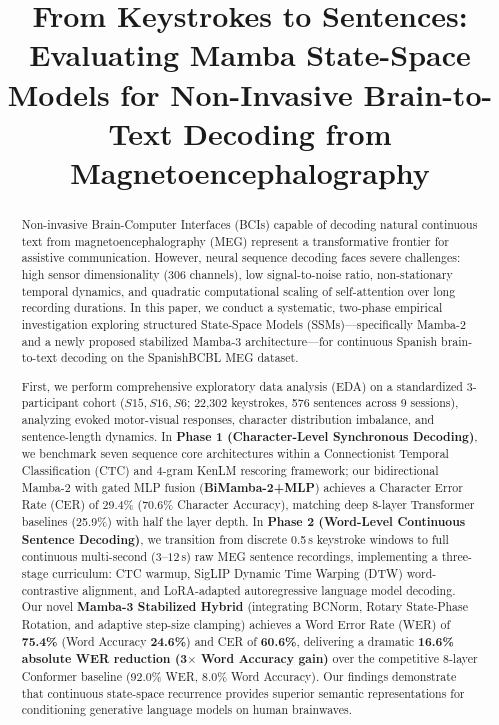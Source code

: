 \documentclass[conference]{IEEEtran}
\begin{document}
\title{From Keystrokes to Sentences: Evaluating Mamba State-Space Models for Non-Invasive Brain-to-Text Decoding from Magnetoencephalography}

\author{
}

\maketitle

\begin{abstract}
Non-invasive Brain-Computer Interfaces (BCIs) capable of decoding natural continuous text from magnetoencephalography (MEG) represent a transformative frontier for assistive communication. However, neural sequence decoding faces severe challenges: high sensor dimensionality (306 channels), low signal-to-noise ratio, non-stationary temporal dynamics, and quadratic computational scaling of self-attention over long recording durations. In this paper, we conduct a systematic, two-phase empirical investigation exploring structured State-Space Models (SSMs)---specifically Mamba-2 and a newly proposed stabilized Mamba-3 architecture---for continuous Spanish brain-to-text decoding on the SpanishBCBL MEG dataset. 

First, we perform comprehensive exploratory data analysis (EDA) on a standardized 3-participant cohort ($S15, S16, S6$; 22,302 keystrokes, 576 sentences across 9 sessions), analyzing evoked motor-visual responses, character distribution imbalance, and sentence-length dynamics. In \textbf{Phase 1 (Character-Level Synchronous Decoding)}, we benchmark seven sequence core architectures within a Connectionist Temporal Classification (CTC) and 4-gram KenLM rescoring framework; our bidirectional Mamba-2 with gated MLP fusion (\textbf{BiMamba-2+MLP}) achieves a Character Error Rate (CER) of 29.4\% (70.6\% Character Accuracy), matching deep 8-layer Transformer baselines (25.9\%) with half the layer depth. In \textbf{Phase 2 (Word-Level Continuous Sentence Decoding)}, we transition from discrete 0.5\,s keystroke windows to full continuous multi-second ($3\text{--}12$\,s) raw MEG sentence recordings, implementing a three-stage curriculum: CTC warmup, SigLIP Dynamic Time Warping (DTW) word-contrastive alignment, and LoRA-adapted autoregressive language model decoding. Our novel \textbf{Mamba-3 Stabilized Hybrid} (integrating BCNorm, Rotary State-Phase Rotation, and adaptive step-size clamping) achieves a Word Error Rate (WER) of \textbf{75.4\%} (Word Accuracy \textbf{24.6\%}) and CER of \textbf{60.6\%}, delivering a dramatic \textbf{16.6\% absolute WER reduction (3$\times$ Word Accuracy gain)} over the competitive 8-layer Conformer baseline (92.0\% WER, 8.0\% Word Accuracy). Our findings demonstrate that continuous state-space recurrence provides superior semantic representations for conditioning generative language models on human brainwaves.
\end{abstract}
\end{document}

